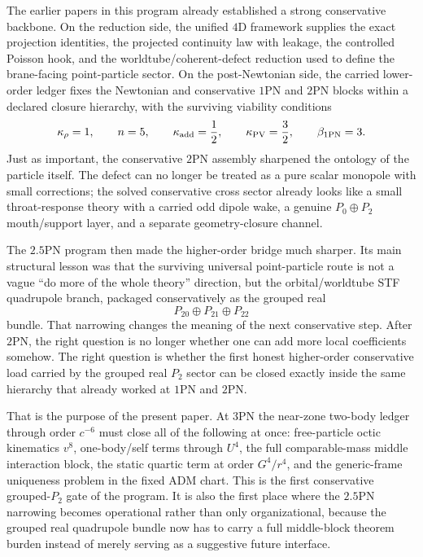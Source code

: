 \documentclass[11pt]{article}
\begin{document}
The earlier papers in this program already established a strong conservative
backbone.  On the reduction side, the unified $4$D framework supplies the exact
projection identities, the projected continuity law with leakage, the controlled
Poisson hook, and the worldtube/coherent-defect reduction used to define the
brane-facing point-particle sector.  On the post-Newtonian side, the carried
lower-order ledger fixes the Newtonian and conservative $1$PN and $2$PN blocks
within a declared closure hierarchy, with the surviving viability conditions
\[
\kappa_\rho = 1,
\qquad
n = 5,
\qquad
\kappa_{\rm add} = \frac{1}{2},
\qquad
\kappa_{\rm PV} = \frac{3}{2},
\qquad
\beta_{\rm 1PN} = 3.
\]
Just as important, the conservative $2$PN assembly sharpened the ontology of the
particle itself.  The defect can no longer be treated as a pure scalar monopole
with small corrections; the solved conservative cross sector already looks like a
small throat-response theory with a carried odd dipole wake, a genuine
$P_0\oplus P_2$ mouth/support layer, and a separate geometry-closure channel.

The $2.5$PN program then made the higher-order bridge much sharper.  Its main
structural lesson was that the surviving universal point-particle route is not a
vague ``do more of the whole theory'' direction, but the orbital/worldtube STF
quadrupole branch, packaged conservatively as the grouped real
\[
P_{20}\oplus P_{21}\oplus P_{22}
\]
bundle.  That narrowing changes the meaning of the next conservative step.
After $2$PN, the right question is no longer whether one can add more local
coefficients somehow.  The right question is whether the first honest
higher-order conservative load carried by the grouped real $P_2$ sector can be
closed exactly inside the same hierarchy that already worked at $1$PN and $2$PN.

That is the purpose of the present paper.  At $3$PN the near-zone two-body
ledger through order $c^{-6}$ must close all of the following at once:
free-particle octic kinematics $v^8$, one-body/self terms through $U^4$, the
full comparable-mass middle interaction block, the static quartic term at order
$G^4/r^4$, and the generic-frame uniqueness problem in the fixed ADM chart.
This is the first conservative grouped-$P_2$ gate of the program.  It is also
the first place where the $2.5$PN narrowing becomes operational rather than only
organizational, because the grouped real quadrupole bundle now has to carry a
full middle-block theorem burden instead of merely serving as a suggestive
future interface.
\end{document}
